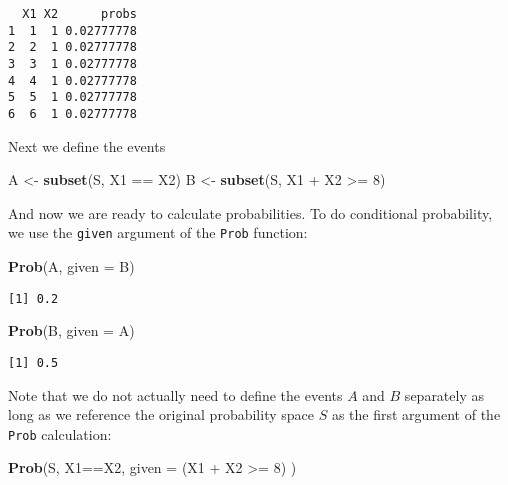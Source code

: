 \documentclass[]{book}
\newenvironment{Shaded}{\begin{snugshade}}{\end{snugshade}}
\newcommand{\KeywordTok}[1]{\textcolor[rgb]{0.13,0.29,0.53}{\textbf{{#1}}}}
\newcommand{\DataTypeTok}[1]{\textcolor[rgb]{0.13,0.29,0.53}{{#1}}}
\newcommand{\DecValTok}[1]{\textcolor[rgb]{0.00,0.00,0.81}{{#1}}}
\newcommand{\StringTok}[1]{\textcolor[rgb]{0.31,0.60,0.02}{{#1}}}
\newcommand{\NormalTok}[1]{{#1}}
\numberwithin{equation}{chapter}
\numberwithin{figure}{chapter}
\theoremstyle{plain}
\theoremstyle{definition}
\theoremstyle{remark}
\theoremstyle{definition}
\theoremstyle{definition}
\theoremstyle{remark}
\begin{document}
\begin{verbatim}
  X1 X2      probs
1  1  1 0.02777778
2  2  1 0.02777778
3  3  1 0.02777778
4  4  1 0.02777778
5  5  1 0.02777778
6  6  1 0.02777778
\end{verbatim}

Next we define the events

\begin{Shaded}
\begin{Highlighting}[]
\NormalTok{A <-}\StringTok{ }\KeywordTok{subset}\NormalTok{(S, X1 ==}\StringTok{ }\NormalTok{X2)}
\NormalTok{B <-}\StringTok{ }\KeywordTok{subset}\NormalTok{(S, X1 +}\StringTok{ }\NormalTok{X2 >=}\StringTok{ }\DecValTok{8}\NormalTok{)}
\end{Highlighting}
\end{Shaded}

And now we are ready to calculate probabilities. To do conditional
probability, we use the \texttt{given} argument of the \texttt{Prob}
function:

\begin{Shaded}
\begin{Highlighting}[]
\KeywordTok{Prob}\NormalTok{(A, }\DataTypeTok{given =} \NormalTok{B)}
\end{Highlighting}
\end{Shaded}

\begin{verbatim}
[1] 0.2
\end{verbatim}

\begin{Shaded}
\begin{Highlighting}[]
\KeywordTok{Prob}\NormalTok{(B, }\DataTypeTok{given =} \NormalTok{A)}
\end{Highlighting}
\end{Shaded}

\begin{verbatim}
[1] 0.5
\end{verbatim}

Note that we do not actually need to define the events \(A\) and \(B\)
separately as long as we reference the original probability space \(S\)
as the first argument of the \texttt{Prob} calculation:

\begin{Shaded}
\begin{Highlighting}[]
\KeywordTok{Prob}\NormalTok{(S, X1==X2, }\DataTypeTok{given =} \NormalTok{(X1 +}\StringTok{ }\NormalTok{X2 >=}\StringTok{ }\DecValTok{8}\NormalTok{) )}
\end{Highlighting}
\end{Shaded}
\end{document}
